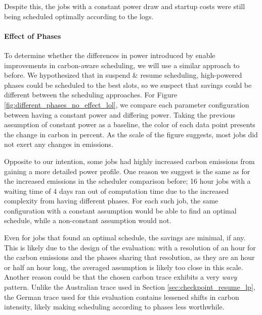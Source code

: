 Despite this, the jobs with a constant power draw and startup costs were still being scheduled optimally according to the logs. 

\paragraph{Effect of Phases}

To determine whether the differences in power introduced by \modelname{} enable improvements in carbon-aware scheduling, we will use a similar approach to before. We hypothesized that in suspend \& resume scheduling, high-powered phases could be scheduled to the best slots, so we suspect that savings could be different between the scheduling approaches. For Figure \ref{fig:different_phases_no_effect_lol}, we compare each parameter configuration between having a constant power and differing power. Taking the previous assumption of constant power as a baseline, the color of each data point presents the change in carbon in percent. As the scale of the figure suggests, most jobs did not exert any changes in emissions. 

Opposite to our intention, some jobs had highly increased carbon emissions from gaining a more detailed power profile.
One reason we suggest is the same as for the increased emissions in the scheduler comparison before; 16 hour jobs with a waiting time of 4 days ran out of computation time due to the increased complexity from having different phases. 
For each such job, the same configuration with a constant assumption would be able to find an optimal schedule, while a non-constant assumption would not.

Even for jobs that found an optimal schedule, the savings are minimal, if any. 
This is likely due to the design of the evaluation: with a resolution of an hour for the carbon emissions and the phases sharing that resolution, as they are an hour or half an hour long, the averaged assumption is likely too close in this scale. Another reason could be that the chosen carbon trace exhibits a very \emph{wavy} pattern. Unlike the Australian trace used in Section \ref{sec:checkpoint_resume_lp}, the German trace used for this evaluation contains lessened shifts in carbon intensity, likely making scheduling according to phases less worthwhile.

